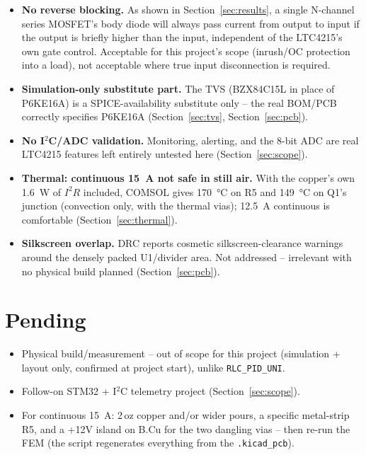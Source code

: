 \documentclass[11pt,letterpaper]{article}
\begin{document}
\begin{itemize}
\item \textbf{No reverse blocking.} As shown in Section~\ref{sec:results}, a single N-channel series
MOSFET's body diode will always pass current from output to input if the output is briefly higher than the
input, independent of the LTC4215's own gate control. Acceptable for this project's scope (inrush/OC
protection into a load), not acceptable where true input disconnection is required.
\item \textbf{Simulation-only substitute part.} The TVS (BZX84C15L in place of P6KE16A) is a
SPICE-availability substitute only -- the real BOM/PCB correctly specifies P6KE16A (Section~\ref{sec:tvs},
Section~\ref{sec:pcb}).
\item \textbf{No I$^2$C/ADC validation.} Monitoring, alerting, and the 8-bit ADC are real LTC4215 features
left entirely untested here (Section~\ref{sec:scope}).
\item \textbf{Thermal: continuous \SI{15}{\ampere} not safe in still air.} With the copper's own
\SI{1.6}{\watt} of $I^2R$ included, COMSOL gives \SI{170}{\celsius} on R5 and \SI{149}{\celsius} on Q1's
junction (convection only, with the thermal vias); \SI{12.5}{\ampere} continuous is comfortable
(Section~\ref{sec:thermal}).
\item \textbf{Silkscreen overlap.} DRC reports cosmetic silkscreen-clearance warnings around the densely
packed U1/divider area. Not addressed -- irrelevant with no physical build planned (Section~\ref{sec:pcb}).
\end{itemize}

\section{Pending}

\begin{pending}
\begin{itemize}
\item Physical build/measurement -- out of scope for this project (simulation + layout only, confirmed at
project start), unlike \texttt{RLC\_PID\_UNI}.
\item Follow-on STM32 + I$^2$C telemetry project (Section~\ref{sec:scope}).
\item For continuous \SI{15}{\ampere}: 2\,oz copper and/or wider pours, a specific metal-strip R5, and a
+12V island on B.Cu for the two dangling vias -- then re-run the FEM (the script regenerates everything
from the \texttt{.kicad\_pcb}).
\end{itemize}
\end{pending}
\end{document}
